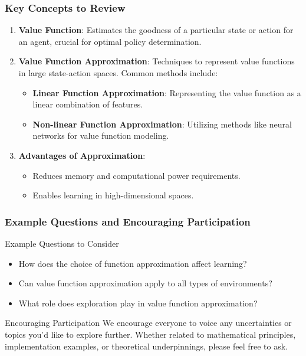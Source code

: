 \documentclass[aspectratio=169]{beamer}
\begin{document}
\begin{frame}[fragile]
    \frametitle{Key Concepts to Review}
    \begin{enumerate}
        \item \textbf{Value Function}: Estimates the goodness of a particular state or action 
              for an agent, crucial for optimal policy determination.
        \item \textbf{Value Function Approximation}: Techniques to represent value functions 
              in large state-action spaces. Common methods include:
            \begin{itemize}
                \item \textbf{Linear Function Approximation}: Representing the value function 
                      as a linear combination of features.
                \item \textbf{Non-linear Function Approximation}: Utilizing methods like neural 
                      networks for value function modeling.
            \end{itemize}
        \item \textbf{Advantages of Approximation}:
            \begin{itemize}
                \item Reduces memory and computational power requirements.
                \item Enables learning in high-dimensional spaces.
            \end{itemize}
    \end{enumerate}
\end{frame}

\begin{frame}[fragile]
    \frametitle{Example Questions and Encouraging Participation}
    \begin{block}{Example Questions to Consider}
        \begin{itemize}
            \item How does the choice of function approximation affect learning?
            \item Can value function approximation apply to all types of environments?
            \item What role does exploration play in value function approximation?
        \end{itemize}
    \end{block}

    \begin{block}{Encouraging Participation}
        We encourage everyone to voice any uncertainties or topics you'd like to explore 
        further. Whether related to mathematical principles, implementation examples, or 
        theoretical underpinnings, please feel free to ask.
    \end{block}
\end{frame}
\end{document}
